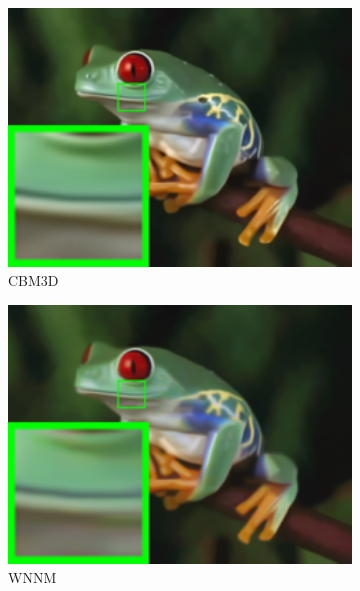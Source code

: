 \begin{figure}
\begin{subfigure}[t]{0.19\textwidth}
        \includegraphics[width=1\textwidth]{images/guided/nc/resize_br_CBM3D_frog.png}
\caption{CBM3D}
    \end{subfigure}
    \hfill
    \begin{subfigure}[t]{0.19\textwidth}
        \centering
        \includegraphics[width=1\textwidth]{images/guided/nc/resize_br_WNNM_frog.png}
\caption{WNNM}
    \end{subfigure}
    \hfill
    \begin{subfigure}[t]{0.19\textwidth}
        \centering

\end{subfigure}
\end{figure}

